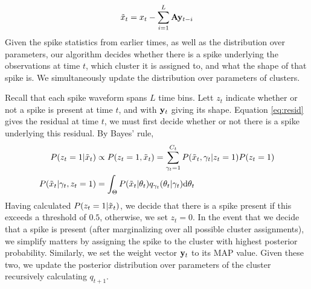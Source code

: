 \begin{align}
  \tilde{x}_t = x_t - \sum_{i=1}^L \mathbf{A}\mathbf{y}_{t-i} \label{eq:resid}
\end{align}
Given the spike statistics from earlier times, as well as the distribution over parameters, our algorithm decides whether there is a spike underlying
the observations at time $t$, which cluster it is assigned to, and what
the shape of that spike is. We simultaneously update the distribution over parameters of clusters. 

Recall that each spike waveform spans $L$ time bins. 
Lett $z_t$ indicate whether or not a spike is present at time $t$, and with $\mathbf{y}_t$ giving its shape. Equation \eqref{eq:resid} gives the residual 
at time $t$, we must first decide whether or not there is a spike underlying this residual.
By Bayes' rule,
\begin{align}
  P(z_t = 1 | \tilde{x}_t)  &\propto P(z_t = 1, \tilde{x}_t) = \sum_{\gamma_t = 1}^{C_t} P(\tilde{x}_t, {\gamma_t} | z_t = 1) P(z_t = 1) \\
  P(\tilde{x}_t | {\gamma_t} , z_t = 1) &= \int_{\Theta} P(\tilde{x}_t | \theta_t) q_{\gamma_t} (\theta_t | \gamma_t) \mathrm{d} \theta_t
\end{align}
Having calculated $P(z_t = 1 | \tilde{x}_t)$, we decide that there is a spike present if this exceeds a threshold of $0.5$, otherwise, we set $z_t = 0$.
In the event that we decide that a spike is present (after marginalizing over all possible cluster assignments), we simplify matters by assigning 
the spike to the cluster with highest posterior probability. Similarly, we set the weight vector $\mathbf{y}_t$ to its MAP value.
Given these two, we update the posterior distribution over parameters of the cluster recursively calculating $q_{t+1}$.
